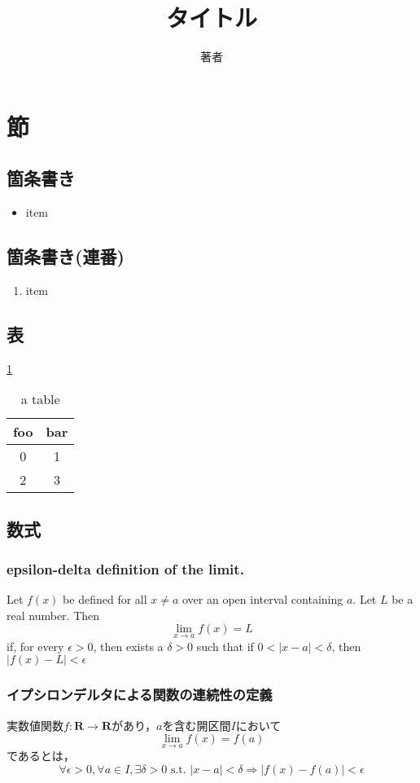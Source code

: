 \documentclass[12pt]{jsarticle}
\begin{document}
\title{タイトル}
\author{著者}
\maketitle

\section{節}

\subsection{箇条書き}
\begin{itemize}
  \item item
\end{itemize}

\subsection{箇条書き(連番)}
\begin{enumerate}
  \item item
\end{enumerate}

\subsection{表}
\ref{tb:table}

\begin{table}[hbtb]
  \centering
  \caption{a table}
  \label{tb:table}
  \begin{tabular}{cc}
    \hline
    foo & bar \\
    \hline \hline
    0 & 1 \\
    2 & 3 \\
    \hline
  \end{tabular}
\end{table}

\subsection{数式}
\subsubsection{epsilon-delta definition of the limit.}
Let $f(x)$ be defined for all $x \neq a$ over an open interval containing $a$. Let $L$ be a real number. Then
$$\lim_{x \rightarrow a} f(x) = L$$
if, for every $\epsilon > 0$, then exists a $\delta > 0$ such that if $0 < |x - a| < \delta$, then $|f(x) - L| < \epsilon$

\subsubsection{イプシロンデルタによる関数の連続性の定義}
実数値関数$f: \mathbf{R} \rightarrow \mathbf{R}$があり，$a$を含む開区間$I$において
$$\lim_{x \rightarrow a} f(x) = f(a)$$
であるとは，
$$\forall \epsilon > 0, \forall a \in I, \exists \delta > 0\mbox{ s.t. } |x - a| < \delta \Rightarrow |f(x) - f(a)| < \epsilon$$
\end{document}
